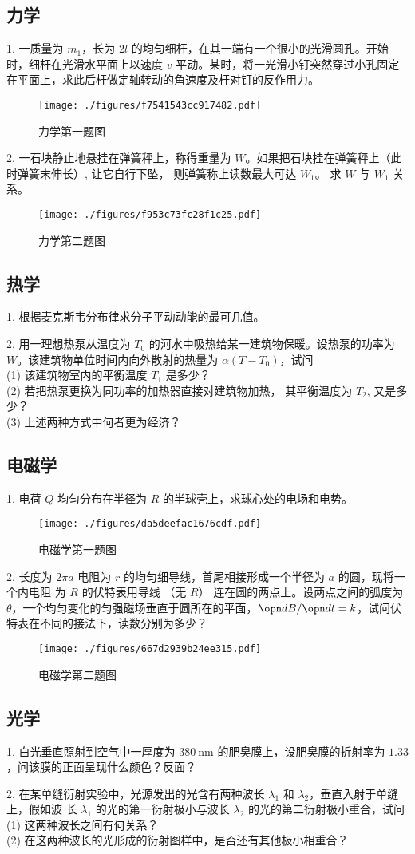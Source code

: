 \subsection{力学}
1. 一质量为 $m_{1}$，长为 $2l$ 的均匀细杆，在其一端有一个很小的光滑圆孔。开始时，细杆在光滑水平面上以速度 $v$ 平动。某时，将一光滑小钉突然穿过小孔固定在平面上，求此后杆做定轴转动的角速度及杆对钉的反作用力。
\begin{figure}[ht]
\centering
\texttt{[image: ./figures/f7541543cc917482.pdf]}
\caption{力学第一题图} \label{fig_NJU14_1}
\end{figure}
2. 一石块静止地悬挂在弹簧秤上，称得重量为 $W$。如果把石块挂在弹簧秤上（此时弹簧末伸长）, 让它自行下坠， 则弹簧称上读数最大可达 $W_{1}$。 求 $W$ 与 $W_{1}$ 关系。
\begin{figure}[ht]
\centering
\texttt{[image: ./figures/f953c73fc28f1c25.pdf]}
\caption{力学第二题图} \label{fig_NJU14_2}
\end{figure}
\subsection{热学}
1. 根据麦克斯韦分布律求分子平动动能的最可几值。

2. 用一理想热泵从温度为 $T_{0}$ 的河水中吸热给某一建筑物保暖。设热泵的功率为 $W$。该建筑物单位时间内向外散射的热量为 $\alpha\left(T-T_{0}\right)$，试问\\
(1) 该建筑物室内的平衡温度 $T_{1}$ 是多少？\\
(2) 若把热泵更换为同功率的加热器直接对建筑物加热， 其平衡温度为 $T_{2}$, 又是多少？\\
(3) 上述两种方式中何者更为经济？\\
\subsection{电磁学}
1. 电荷 $Q$ 均匀分布在半径为 $R$ 的半球壳上，求球心处的电场和电势。
\begin{figure}[ht]
\centering
\texttt{[image: ./figures/da5deefac1676cdf.pdf]}
\caption{电磁学第一题图} \label{fig_NJU14_4}
\end{figure}
2. 长度为 $2 \pi a$ 电阻为 $r$ 的均匀细导线，首尾相接形成一个半径为 $a$ 的圆，现将一个内电阻 为 $R$ 的伏特表用导线 （无 $R$） 连在圆的两点上。设两点之间的弧度为 $\theta$，一个均匀变化的匀强磁场垂直于圆所在的平面，$\opn dB/\opn dt =k$，试问伏特表在不同的接法下，读数分别为多少？
\begin{figure}[ht]
\centering
\texttt{[image: ./figures/667d2939b24ee315.pdf]}
\caption{电磁学第二题图} \label{fig_NJU14_3}
\end{figure}
\subsection{光学}
1. 白光垂直照射到空气中一厚度为 $380 \mathrm{~nm}$ 的肥㚖膜上，设肥㚖膜的折射率为 $1.33$，问该膜的正面呈现什么颜色？反面？

2. 在某单缝衍射实验中，光源发出的光含有两种波长 $\lambda_{1}$ 和 $\lambda_{2}$，垂直入射于单缝上，假如波 长 $\lambda_{1}$ 的光的第一衍射极小与波长 $\lambda_{2}$ 的光的第二衍射极小重合，试问\\
(1) 这两种波长之间有何关系？\\
(2) 在这两种波长的光形成的衍射图样中，是否还有其他极小相重合？
